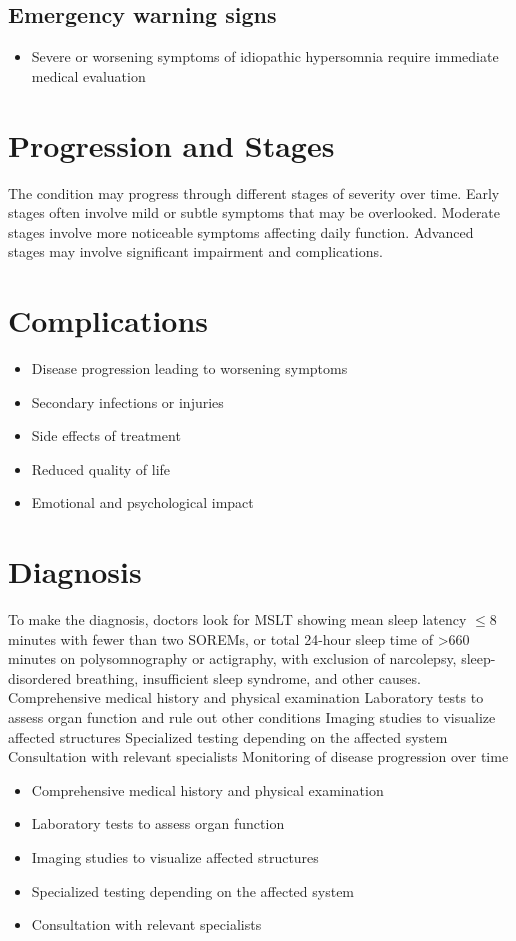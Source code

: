 \subsection{Emergency warning signs}
\begin{itemize}[noitemsep]
  \item Severe or worsening symptoms of idiopathic hypersomnia require immediate medical evaluation
\end{itemize}
\section{Progression and Stages}
The condition may progress through different stages of severity over time. Early stages often involve mild or subtle symptoms that may be overlooked. Moderate stages involve more noticeable symptoms affecting daily function. Advanced stages may involve significant impairment and complications.
\section{Complications}
\begin{itemize}[noitemsep]
  \item Disease progression leading to worsening symptoms
  \item Secondary infections or injuries
  \item Side effects of treatment
  \item Reduced quality of life
  \item Emotional and psychological impact
\end{itemize}
\section{Diagnosis}
To make the diagnosis, doctors look for MSLT showing mean sleep latency $\le$8 minutes with fewer than two SOREMs, or total 24-hour sleep time of >660 minutes on polysomnography or actigraphy, with exclusion of narcolepsy, sleep-disordered breathing, insufficient sleep syndrome, and other causes. Comprehensive medical history and physical examination Laboratory tests to assess organ function and rule out other conditions Imaging studies to visualize affected structures Specialized testing depending on the affected system Consultation with relevant specialists Monitoring of disease progression over time

\begin{itemize}[noitemsep]
  \item Comprehensive medical history and physical examination
  \item Laboratory tests to assess organ function
  \item Imaging studies to visualize affected structures
  \item Specialized testing depending on the affected system
  \item Consultation with relevant specialists
\end{itemize}
